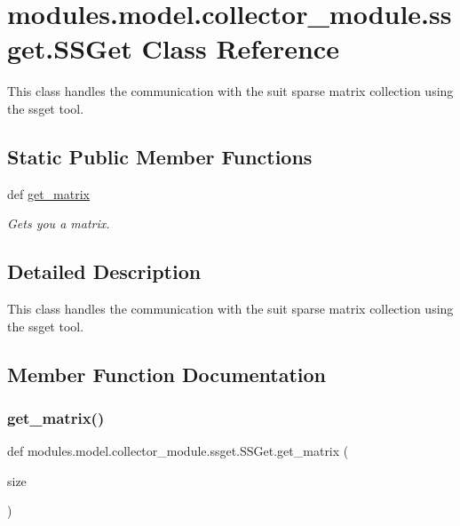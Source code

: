 \hypertarget{classmodules_1_1model_1_1collector__module_1_1ssget_1_1_s_s_get}{}\section{modules.\+model.\+collector\+\_\+module.\+ssget.\+S\+S\+Get Class Reference}
\label{classmodules_1_1model_1_1collector__module_1_1ssget_1_1_s_s_get}


This class handles the communication with the suit sparse matrix collection using the ssget tool.  


\subsection*{Static Public Member Functions}
\begin{DoxyCompactItemize}
\item 
def \mbox{\hyperlink{classmodules_1_1model_1_1collector__module_1_1ssget_1_1_s_s_get_af928bff258646991311a9d68b83e8c10}{get\+\_\+matrix}}
\begin{DoxyCompactList}\small\item\em Gets you a matrix. \end{DoxyCompactList}\end{DoxyCompactItemize}


\subsection{Detailed Description}
This class handles the communication with the suit sparse matrix collection using the ssget tool. 

\subsection{Member Function Documentation}
\mbox{\label{classmodules_1_1model_1_1collector__module_1_1ssget_1_1_s_s_get_af928bff258646991311a9d68b83e8c10}} 
\subsubsection{\texorpdfstring{get\+\_\+matrix()}{get\_matrix()}}
{\footnotesize\ttfamily def modules.\+model.\+collector\+\_\+module.\+ssget.\+S\+S\+Get.\+get\+\_\+matrix (\begin{DoxyParamCaption}\item[{}]{size }\end{DoxyParamCaption})\hspace{0.3cm}{\ttfamily [static]}}



